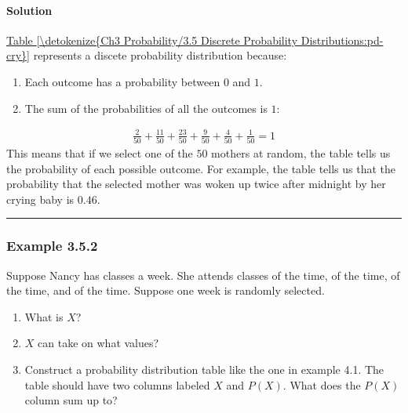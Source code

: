 \documentclass[letterpaper,10pt,english]{jupyterBook}
\begin{document}
\paragraph{Solution}
\label{\detokenize{Ch3 Probability/3.5 Discrete Probability Distributions:solution}}
\sphinxAtStartPar
\hyperref[\detokenize{Ch3 Probability/3.5 Discrete Probability Distributions:pd-cry}]{Table \ref{\detokenize{Ch3 Probability/3.5 Discrete Probability Distributions:pd-cry}}} represents a discete probability distribution because:
\begin{enumerate}
%
\item {} 
\sphinxAtStartPar
Each outcome has a probability between \(0\) and \(1\).

\item {} 
\sphinxAtStartPar
The sum of the probabilities of all the outcomes is \(1\):

\end{enumerate}
\begin{equation*}
\begin{split} \frac{2}{50} + \frac{11}{50} + \frac{23}{50} + \frac{9}{50} + \frac{4}{50} + \frac{1}{50} = 1 \end{split}
\end{equation*}
\sphinxAtStartPar
This means that if we select one of the \(50\) mothers at random, the table tells us the probability of each possible outcome. For example, the table tells us that the probability that the selected mother was woken up twice after midnight by her crying baby is \(0.46\).


\bigskip\hrule\bigskip



\subsubsection{Example 3.5.2}
\label{\detokenize{Ch3 Probability/3.5 Discrete Probability Distributions:example-3-5-2}}
\sphinxAtStartPar
Suppose Nancy has classes  a week. She attends classes  of the time,  of the time,  of the time, and  of the time. Suppose one week is randomly selected.
\begin{enumerate}
%
\item {} 
\sphinxAtStartPar
What is \(X\)?

\item {} 
\sphinxAtStartPar
\(X\) can take on what values?

\item {} 
\sphinxAtStartPar
Construct a probability distribution table like the one in example 4.1. The table should have two columns labeled \(X\) and \(P(X)\). What does the \(P(X)\) column sum up to?

\end{enumerate}
\end{document}
